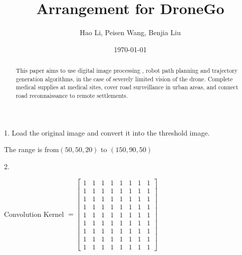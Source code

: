 \documentclass{article} %
\title{Arrangement for DroneGo}  %
\author{Hao Li, Peisen Wang, Benjia Liu}   %
\date{\today}       %
\begin{document}
\maketitle

\begin{abstract}
This paper aims to use digital image processing , robot path planning and trajectory generation algorithms, in the case of severely limited vision of the drone. Complete medical supplies at medical sites, cover road surveillance in urban areas, and connect road reconnaissance to remote settlements.
\end{abstract}


1. Load the original image and convert it into the threshold image.

\centerline{The range is from$
(50,  50, 20)$ to $(150,  90, 50)$}

2. 

\centerline{Convolution Kernel $=\left[\begin{array}{cccccccc}{1} & {1} & {1} & {1} & {1} & {1} & {1} & {1} \\ {1} & {1} & {1} & {1} & {1} & {1} & {1} & {1} \\ {1} & {1} & {1} & {1} & {1} & {1} & {1} & {1} \\ {1} & {1} & {1} & {1} & {1} & {1} & {1} & {1} \\ {1} & {1} & {1} & {1} & {1} & {1} & {1} & {1} \\ {1} & {1} & {1} & {1} & {1} & {1} & {1} & {1} \\ {1} & {1} & {1} & {1} & {1} & {1} & {1} & {1} \\ {1} & {1} & {1} & {1} & {1} & {1} & {1} & {1} \\ {1} & {1} & {1} & {1} & {1} & {1} & {1} & {1}\end{array}\right]$}
    
\end{document}
